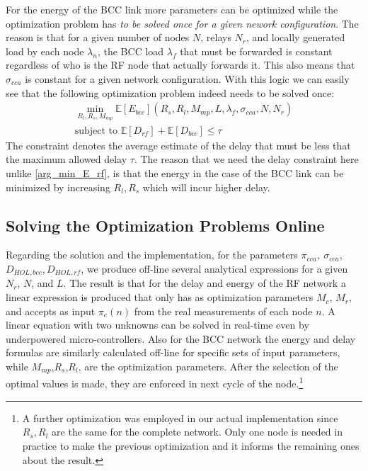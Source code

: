\documentclass[10pt]{IEEEtran}
\newcounter{section:outage-analysis}
\begin{document}
For the energy of the BCC link more parameters can be optimized while the optimization problem has \emph{to be solved once for a given nework configuration}. The reason is that for a given number of nodes $N$, relays $N_r$, and locally generated load by each node $\lambda_n$, the BCC load $\lambda_f$ that must be forwarded is constant regardless of who is the RF node that actually forwards it. This also means that $\sigma_{cca}$ is constant for a given network configuration. With this logic we can easily see that the following optimization problem indeed needs to be solved once:
\begin{eqnarray}\label{arg_min_E_bcc}
\min_{R_l,R_s,M_{mp}} \mathbb{E}[E_{bcc}](R_s,R_l,M_{mp},L,\lambda_f,\sigma_{cca},N,N_r)\\
    \text{subject to } \mathbb{E}[D_{rf}]+\mathbb{E}[D_{bcc}] \leq \tau \nonumber
\end{eqnarray}
The constraint denotes the average estimate of the delay that must be less that the maximum allowed delay $\tau$. The reason that we need the delay constraint here unlike \eqref{arg_min_E_rf}, is that the energy in the case of the BCC link can be minimized by increasing $R_l,R_s$ which will incur higher delay.

\subsection{Solving the Optimization Problems Online}
Regarding the solution and the implementation, for the parameters $\pi_{cca},~\sigma_{cca}$, $D_{HOL,bcc}, D_{HOL,rf}$, we produce off-line several analytical expressions for a given $N_r$, $N$, and $L$. The result is that for the delay and energy of the RF network a linear expression is produced that only has as optimization parameters $M_c$, $M_r$, and accepts as input $\pi_e(n)$ from the real measurements of each node $n$. A linear equation with two unknowns can be solved in real-time even by underpowered micro-controllers. Also for the BCC network the energy and delay formulas are similarly calculated off-line for specific sets of input parameters, while $M_{mp}$,$R_s$,$R_l$, are the optimization parameters. After the selection of the optimal values is made, they are enforced in next cycle of the node.\footnote{A further optimization was employed in our actual implementation since $R_s,R_l$ are the same for the complete network. Only one node is needed in practice to make the previous optimization and it informs the remaining ones about the result.}
\end{document}
